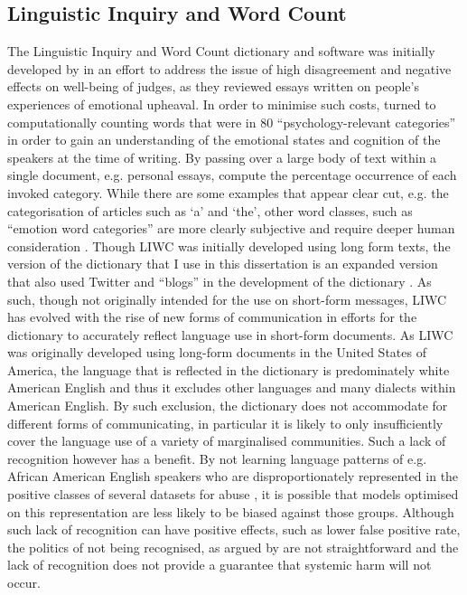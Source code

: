 \subsection{Linguistic Inquiry and Word Count}
The Linguistic Inquiry and Word Count dictionary and software was initially developed by \citet{Pennebaker:2001} in an effort to address the issue of high disagreement and negative effects on well-being of judges, as they reviewed essays written on people's experiences of emotional upheaval.
In order to minimise such costs, \citet{Pennebaker:2001} turned to computationally counting words that were in $80$ ``psychology-relevant categories'' in order to gain an understanding of the emotional states and cognition of the speakers at the time of writing.
By passing over a large body of text within a single document, e.g. personal essays, \citet{Pennebaker:2001} compute the percentage occurrence of each invoked category.
While there are some examples that appear clear cut, e.g. the categorisation of articles such as `a' and `the', other word classes, such as ``emotion word categories'' are more clearly subjective and require deeper human consideration \citep{Tausczik:2010}.
Though LIWC was initially developed using long form texts, the version of the dictionary that I use in this dissertation is an expanded version that also used Twitter and ``blogs'' in the development of the dictionary \citep{Pennebaker:2015}.
As such, though not originally intended for the use on short-form messages, LIWC has evolved with the rise of new forms of communication in efforts for the dictionary to accurately reflect language use in short-form documents.
As LIWC was originally developed using long-form documents in the United States of America, the language that is reflected in the dictionary is predominately white American English and thus it excludes other languages and many dialects within American English.
By such exclusion, the dictionary does not accommodate for different forms of communicating, in particular it is likely to only insufficiently cover the language use of a variety of marginalised communities.
Such a lack of recognition however has a benefit.
By not learning language patterns of e.g. African American English speakers who are disproportionately represented in the positive classes of several datasets for abuse \citep{Waseem:2018,Davidson:2019}, it is possible that models optimised on this representation are less likely to be biased against those groups.
Although such lack of recognition can have positive effects, such as lower false positive rate, the politics of not being recognised, as argued by \citet{Benjamin:2019} are not straightforward and the lack of recognition does not provide a guarantee that systemic harm will not occur.
